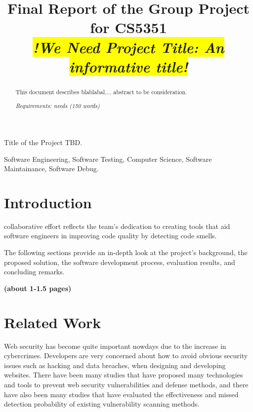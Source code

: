\documentclass[journal]{IEEEtran}
\begin{document}
\title{Final Report of the Group Project for CS5351\\
\colorbox{yellow}{\textit{!We Need Project Title: An informative title!}}
}





%
{Title of the Project TBD.}

\maketitle

\begin{abstract}
This document describes blablabal....
abstract to be consideration.

\textit{Requirements: needs (150 words) }

\end{abstract}

\begin{IEEEkeywords}
Software Engineering, Software Testing, Computer Science, Software Maintainance, Software Debug.
\end{IEEEkeywords}


\section{Introduction}
 collaborative effort reflects the team's dedication to creating tools that aid software engineers in improving code quality by detecting code smells. 

The following sections provide an in-depth look at the project's background, the proposed solution, the software development process, evaluation results, and concluding remarks.

\textbf{(about 1-1.5 pages)}

\section{Related Work}
\noindent Web security has become quite important nowdays due to the increase in cybercrimes. Developers are very concerned about how to avoid obvious security issues such as hacking and data breaches, when designing and developing websites. There have been many studies that have proposed many technologies and tools to prevent web security vulnerabilities and defense methods, and there have also been many studies that have evaluated the effectiveness and missed detection probability of existing vulnerability scanning methods. 
\end{document}
